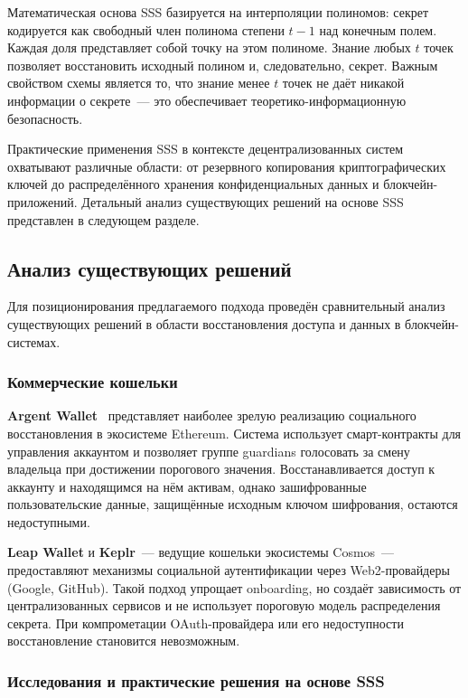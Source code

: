\documentclass[12pt]{a&t}
\begin{document}
Математическая основа SSS базируется на интерполяции полиномов: секрет кодируется как свободный член полинома степени $t-1$ над конечным полем. Каждая доля представляет собой точку на этом полиноме. Знание любых $t$ точек позволяет восстановить исходный полином и, следовательно, секрет. Важным свойством схемы является то, что знание менее $t$ точек не даёт никакой информации о секрете~--- это обеспечивает теоретико-информационную безопасность.

Практические применения SSS в контексте децентрализованных систем охватывают различные области: от резервного копирования криптографических ключей до распределённого хранения конфиденциальных данных и блокчейн-приложений. Детальный анализ существующих решений на основе SSS представлен в следующем разделе.

\subsection{Анализ существующих решений}

Для позиционирования предлагаемого подхода проведён сравнительный анализ существующих решений в области восстановления доступа и данных в блокчейн-системах.

\subsubsection{Коммерческие кошельки}

\textbf{Argent Wallet}~\cite{argent} представляет наиболее зрелую реализацию социального восстановления в экосистеме Ethereum. Система использует смарт-контракты для управления аккаунтом и позволяет группе guardians голосовать за смену владельца при достижении порогового значения. Восстанавливается доступ к аккаунту и находящимся на нём активам, однако зашифрованные пользовательские данные, защищённые исходным ключом шифрования, остаются недоступными.

\textbf{Leap Wallet} и \textbf{Keplr}~--- ведущие кошельки экосистемы Cosmos~--- предоставляют механизмы социальной аутентификации через Web2-провайдеры (Google, GitHub). Такой подход упрощает onboarding, но создаёт зависимость от централизованных сервисов и не использует пороговую модель распределения секрета. При компрометации OAuth-провайдера или его недоступности восстановление становится невозможным.

\subsubsection{Исследования и практические решения на основе SSS}
\end{document}
